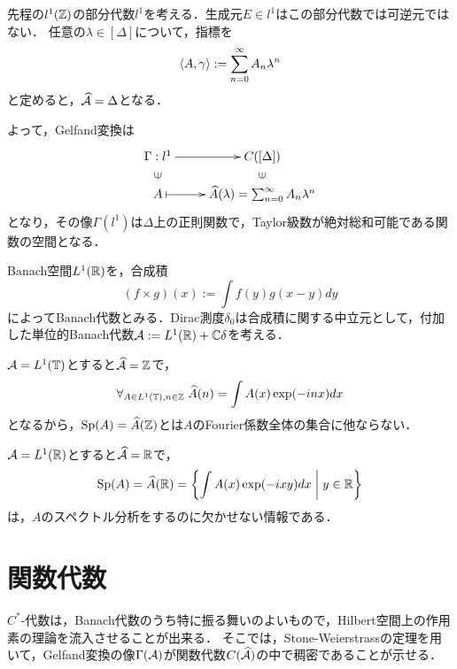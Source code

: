 \documentclass[uplatex,dvipdfmx]{jsreport}
\begin{document}
\begin{example}[絶対収束数列の部分代数と絶対収束するTaylor級数を持つ正則関数の間のGelfand変換]
    先程の$l^1(\mathbb{Z})$の部分代数$l^1$を考える．生成元$E\in l^1$はこの部分代数では可逆元ではない．
    任意の$\lambda\in[\Delta]$について，指標を
    \[\langle A,\gamma\rangle:=\sum^\infty_{n=0}A_n\lambda^n\]
    と定めると，$\widehat{\mathcal{A}}=\Delta$となる．

    よって，Gelfand変換は
    \[\xymatrix@R-2pc{
        \Gamma:l^1\ar[r]&C([\Delta])\\
        \rotatebox[origin=c]{90}{$\in$}&\rotatebox[origin=c]{90}{$\in$}\\
        A\ar@{|->}[r]&\wh{A}(\lambda)=\sum^\infty_{n=0}A_n\lambda^n
    }\]
    となり，その像$\Gamma(l^1)$は$\Delta$上の正則関数で，Taylor級数が絶対総和可能である関数の空間となる．
\end{example}

\begin{example}[可積分関数のBanach代数に関するGelfand変換はFourier変換に他ならない]
    Banach空間$L^1(\mathbb{R})$を，合成積
    \[(f\times g)(x):=\int f(y)g(x-y)dy\]
    によってBanach代数とみる．Dirac測度$\delta_0$は合成積に関する中立元として，付加した単位的Banach代数$\mathcal{A}:=L^1(\mathbb{R})+\mathbb{C}\delta$を考える．


\end{example}
\begin{remark}[Fourier係数全体の集合としてのスペクトル]\label{remark-spectrum-as-Fourier-coefficient}
    $\mathcal{A}=L^1(\mathbb{T})$とすると$\widehat{\mathcal{A}}=\mathbb{Z}$で，
    \[\forall_{A\in L^1(\mathbb{T}),n\in\mathbb{Z}}\;\widehat{A}(n)=\int A(x)\exp(-inx)dx\]
    となるから，$\mathrm{Sp}(A)=\widehat{A}(\mathbb{Z})$とは$A$のFourier係数全体の集合に他ならない．

    $\mathcal{A}=L^1(\mathbb{R})$とすると$\widehat{\mathcal{A}}=\mathbb{R}$で，
    \[\mathrm{Sp}(A)=\widehat{A}(\mathbb{R})=\left\{\int A(x)\exp(-ixy)dx\;\middle|\;y\in\mathbb{R}\right\}\]
    は，$A$のスペクトル分析をするのに欠かせない情報である．
\end{remark}

\section{関数代数}

\begin{tcolorbox}[colframe=ForestGreen, colback=ForestGreen!10!white,breakable,colbacktitle=ForestGreen!40!white,coltitle=black,fonttitle=\bfseries\sffamily,
title=]
    $C^*$-代数は，Banach代数のうち特に振る舞いのよいもので，Hilbert空間上の作用素の理論を流入させることが出来る．
    そこでは，Stone-Weierstrassの定理を用いて，Gelfand変換の像$\Gamma(\mathcal{A})$が関数代数$C(\widehat{\mathcal{A}})$の中で稠密であることが示せる．
\end{tcolorbox}
\end{document}
